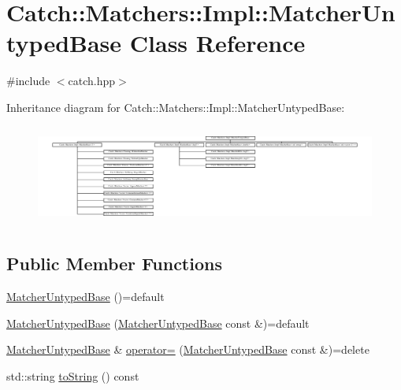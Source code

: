\hypertarget{class_catch_1_1_matchers_1_1_impl_1_1_matcher_untyped_base}{}\section{Catch\+::Matchers\+::Impl\+::Matcher\+Untyped\+Base Class Reference}
\label{class_catch_1_1_matchers_1_1_impl_1_1_matcher_untyped_base}


{\ttfamily \#include $<$catch.\+hpp$>$}

Inheritance diagram for Catch\+::Matchers\+::Impl\+::Matcher\+Untyped\+Base\+:\begin{figure}[H]
\begin{center}
\leavevmode
\includegraphics[height=3.323442cm]{class_catch_1_1_matchers_1_1_impl_1_1_matcher_untyped_base}
\end{center}
\end{figure}
\subsection*{Public Member Functions}
\begin{DoxyCompactItemize}
\item 
\mbox{\hyperlink{class_catch_1_1_matchers_1_1_impl_1_1_matcher_untyped_base_ab65764dc245d85e2b268d3be870b650a}{Matcher\+Untyped\+Base}} ()=default
\item 
\mbox{\hyperlink{class_catch_1_1_matchers_1_1_impl_1_1_matcher_untyped_base_a985fd3c3ffcc9f2e8dc7a330130040b0}{Matcher\+Untyped\+Base}} (\mbox{\hyperlink{class_catch_1_1_matchers_1_1_impl_1_1_matcher_untyped_base}{Matcher\+Untyped\+Base}} const \&)=default
\item 
\mbox{\hyperlink{class_catch_1_1_matchers_1_1_impl_1_1_matcher_untyped_base}{Matcher\+Untyped\+Base}} \& \mbox{\hyperlink{class_catch_1_1_matchers_1_1_impl_1_1_matcher_untyped_base_a62668ccc47b64a9094dcb6413f9af80b}{operator=}} (\mbox{\hyperlink{class_catch_1_1_matchers_1_1_impl_1_1_matcher_untyped_base}{Matcher\+Untyped\+Base}} const \&)=delete
\item 
std\+::string \mbox{\hyperlink{class_catch_1_1_matchers_1_1_impl_1_1_matcher_untyped_base_a5982c7c80ca71dfe2298babadad7a453}{to\+String}} () const
\end{DoxyCompactItemize}

